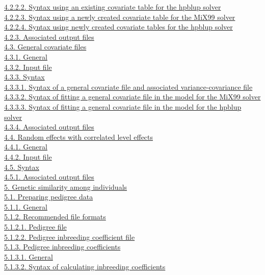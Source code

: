 \hyperref[Obse11]{4.2.2.2. Syntax using an existing covariate table for
the hpblup solver}\\
\hyperref[Obse12]{4.2.2.3. Syntax using a newly created covariate table
for the MiX99 solver}\\
\hyperref[Obse13]{4.2.2.4. Syntax using newly created covariate tables
for the hpblup solver}\\
\hyperref[Obse15]{4.2.3. Associated output files}\\
\hyperref[Obse16]{4.3. General covariate files}\\
\hyperref[Obse17]{4.3.1. General}\\
\hyperref[Obse18]{4.3.2. Input file}\\
\hyperref[Obse19]{4.3.3. Syntax}\\
\hyperref[Obse20]{4.3.3.1. Syntax of a general covariate file and
associated variance-covariance file}\\
\hyperref[Obse23]{4.3.3.2. Syntax of fitting a general covariate file in
the model for the MiX99 solver}\\
\hyperref[Obse25]{4.3.3.3. Syntax of fitting a general covariate file in
the model for the hpblup solver}\\
\hyperref[Obse27]{4.3.4. Associated output files}\\
\hyperref[Obse28]{4.4. Random effects with correlated level effects}\\
\hyperref[Obse29]{4.4.1. General}\\
\hyperref[Obse30]{4.4.2. Input file}\\
\hyperref[Obse31]{4.5. Syntax}\\
\hyperref[Obse32]{4.5.1. Associated output files}\\
\hyperref[Gene01]{5. Genetic similarity among individuals}\\
\hyperref[Gene02]{5.1. Preparing pedigree data}\\
\hyperref[Gene03]{5.1.1. General}\\
\hyperref[Gene04]{5.1.2. Recommended file formats}\\
\hyperref[Gene05]{5.1.2.1. Pedigree file}\\
\hyperref[Gene06]{5.1.2.2. Pedigree inbreeding coefficient file}\\
\hyperref[Gene07]{5.1.3. Pedigree inbreeding coefficients}\\
\hyperref[Gene08]{5.1.3.1. General}\\
\hyperref[Gene09]{5.1.3.2. Syntax of calculating inbreeding
coefficients}\\
